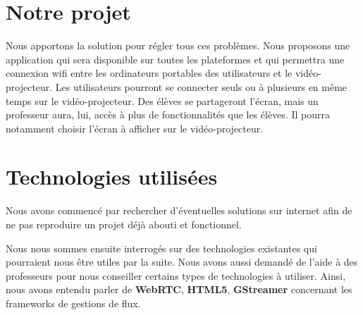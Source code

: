 \documentclass[a4paper, 11pt]{article}
\begin{document}
\section{Notre projet}

Nous apportons la solution pour régler tous ces problèmes. Nous proposons une application qui sera disponible sur toutes les plateformes et qui permettra une connexion wifi entre les ordinateurs portables des utilisateurs et le vidéo-projecteur. Les utilisateurs pourront se connecter seuls ou à plusieurs en même temps sur le vidéo-projecteur. Des élèves se partageront l'écran, mais un professeur aura, lui, accès à plus de fonctionnalités que les élèves. Il pourra notamment choisir l'écran à afficher sur le vidéo-projecteur.

\section{Technologies utilisées}

Nous avons commencé par rechercher d'éventuelles solutions sur internet afin de ne pas reproduire un projet déjà abouti et fonctionnel. 

Nous nous sommes ensuite interrogés sur des technologies existantes qui pourraient nous être utiles par la suite. Nous avons aussi demandé de l'aide à des professeurs pour nous conseiller certains types de technologies à utiliser. Ainsi, nous avons entendu parler de \textbf{WebRTC}, \textbf{HTML5}, \textbf{GStreamer} concernant les frameworks de gestions de flux. 
\end{document}
